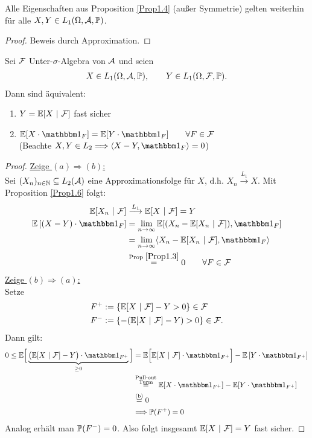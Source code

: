 \begin{korollar} %
Alle Eigenschaften aus Proposition \ref{Prop1.4} (außer Symmetrie) gelten weiterhin für alle $X,Y\in L_1(\Omega,\A,\P)$.
\end{korollar}
\begin{proof}
Beweis durch Approximation.
\end{proof}

\begin{theorem}\label{theorem1.8}%
Sei $\F$ Unter-$\sigma$-Algebra von $\A$ und seien
\begin{align*}
X\in L_1(\Omega,\A,\P),\qquad Y\in L_1(\Omega,\F,\P).
\end{align*}
Dann sind äquivalent:
\begin{enumerate}[label=(\alph*)]
\item $Y=\E[X~|~\F]$ fast sicher
\item $\E[X\cdot\indi_F]=\E[Y\cdot\indi_F]\qquad\forall F\in\F$\\
(Beachte $X,Y\in L_2\Longrightarrow\langle X-Y,\indi_F\rangle=0$)
\end{enumerate}
\end{theorem}
\begin{proof}
\underline{Zeige $(a)\Longrightarrow (b)$:}\\
Sei $(X_n)_{n\in\N}\subseteq L_2(\A)$ eine Approximationsfolge für $X$, d.h. $X_n\stackrel{L_1}{\longrightarrow} X$. Mit Proposition \ref{Prop1.6} folgt:
\begin{align*}
\E[X_n~|~\F]
&\stackrel{L_1}{\longrightarrow}
\E[X~|~\F]=Y\\
\E\left[(X-Y)\cdot\indi_F\right]
&=
\limn\E[(X_n-\E[X_n~|~\F]),\indi_F]\\
&=
\limn\langle X_n-\E[X_n~|~\F],\indi_F\rangle\\
&\stackrel{\text{Prop }\ref{Prop1.3}}{=}
0\qquad\forall F\in\F
\end{align*}
\underline{Zeige $(b)\Longrightarrow (a)$:}\\
Setze 
\begin{align*}
F^{+}&:=\left\lbrace\E[X~|~\F]-Y>0\right\rbrace\in\F\\
F^{-}&:=\left\lbrace-(\E[X~|~\F]-Y)>0\right\rbrace\in\F.
\end{align*}
Dann gilt:
\begin{align*}
0
\leq
\E\Big[\underbrace{\big(\E[X~|~\F]-Y\big)\cdot\indi_{F^+}}_{\geq0}\Big]
&=
\E\Big[\E[X~|~\F]\cdot\indi_{F^+}\Big]-\E\left[Y\cdot\indi_{F^+}\right]\\
&\stackeq{
\begin{subarray}{c}
	\text{Pull-out} \\ \text{Turm}
\end{subarray}
}
\E[X\cdot\indi_{F^+}]-\E[Y\cdot\indi_{F^+}]\\
&\stackeq{\text{(b)}}
0\\
&\Longrightarrow\P(F^+)=0
\end{align*}
Analog erhält man $\P(F^-)=0$. Also folgt insgesamt $\E[X~|~\F]=Y$ fast sicher.
\end{proof}

